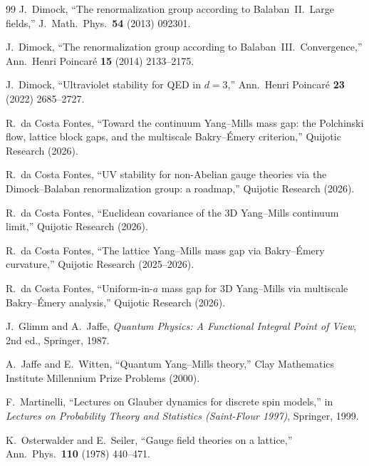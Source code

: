 \documentclass[11pt,a4paper]{article}
\theoremstyle{plain}
\theoremstyle{definition}
\theoremstyle{remark}
\begin{document}
\begin{thebibliography}{99}
 J.~Dimock, ``The renormalization group
  according to Balaban~II.~Large fields,''
  J.~Math.\ Phys.\ \textbf{54} (2013) 092301.

 J.~Dimock, ``The renormalization group
  according to Balaban~III.~Convergence,''
  Ann.\ Henri Poincar\'e \textbf{15} (2014) 2133--2175.

 J.~Dimock, ``Ultraviolet stability
  for QED in $d=3$,''
  Ann.\ Henri Poincar\'e \textbf{23} (2022) 2685--2727.

 R.~da Costa Fontes, ``Toward the
  continuum Yang--Mills mass gap: the Polchinski flow,
  lattice block gaps, and the multiscale Bakry--\'Emery
  criterion,'' Quijotic Research (2026).

 R.~da Costa Fontes, ``UV stability
  for non-Abelian gauge theories via the Dimock--Balaban
  renormalization group: a roadmap,''
  Quijotic Research (2026).

 R.~da Costa Fontes, ``Euclidean
  covariance of the 3D Yang--Mills continuum limit,''
  Quijotic Research (2026).

 R.~da Costa Fontes, ``The lattice
  Yang--Mills mass gap via Bakry--\'Emery curvature,''
  Quijotic Research (2025--2026).

 R.~da Costa Fontes, ``Uniform-in-$a$
  mass gap for 3D Yang--Mills via multiscale
  Bakry--\'Emery analysis,'' Quijotic Research (2026).

 J.~Glimm and A.~Jaffe, \emph{Quantum
  Physics: A Functional Integral Point of View},
  2nd ed., Springer, 1987.

 A.~Jaffe and E.~Witten, ``Quantum
  Yang--Mills theory,'' Clay Mathematics Institute
  Millennium Prize Problems (2000).

 F.~Martinelli, ``Lectures on
  Glauber dynamics for discrete spin models,'' in
  \emph{Lectures on Probability Theory and Statistics
  (Saint-Flour 1997)}, Springer, 1999.

 K.~Osterwalder and E.~Seiler, ``Gauge
  field theories on a lattice,''
  Ann.\ Phys.\ \textbf{110} (1978) 440--471.

\end{thebibliography}
\end{document}
